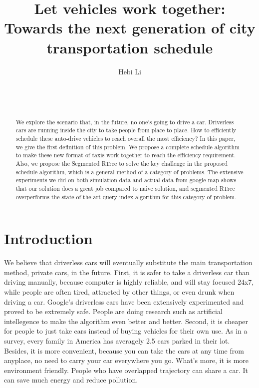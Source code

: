 \documentclass{vldb}
\begin{document}
\title{Let vehicles work together:
Towards the next generation of city transportation schedule}

\author{
\alignauthor
Hebi Li\\
       \\
       \\
       \\
}

\maketitle

\begin{abstract}
We explore the scenario that, in the future, no one's going to drive a car.
Driverless cars are running inside the city to take people from place to place.
How to efficiently schedule these auto-drive vehicles to reach overall the most efficiency?
In this paper, we give the first definition of this problem.
We propose a complete schedule algorithm to make these new format of taxis work together to reach the efficiency requirement.
Also, we propose the Segmented RTree to solve the key challenge in the proposed schedule algorithm,
which is a general method of a category of problems.
The extensive experiments we did on both simulation data and actual data from google map
shows that our solution does a great job compared to naive solution,
and segmented RTree overperforms the state-of-the-art query index algorithm for this category of problem.
\end{abstract}




\section{Introduction}

We believe that driverless cars will eventually substitute the main transportation method,
private cars, in the future.
First, it is safer to take a driverless car than driving manually,
because computer is highly reliable, and will stay focused 24x7,
while people are often tired, attracted by other things, or even drunk when driving a car.
Google’s driverless cars have been extensively experimented and proved to be extremely safe.
People are doing research such as artificial intellegence to make the algorithm even better and better.
Second, it is cheaper for people to just take cars instead of buying vehicles for their own use.
As in a survey, every family in America has averagely 2.5 cars parked in their lot.
Besides, it is more convenient, because you can take the cars at any time from anyplace,
no need to carry your car everywhere you go. What’s more, it is more environment friendly.
People who have overlapped trajectory can share a car.
It can save much energy and reduce pollution.
\end{document}

